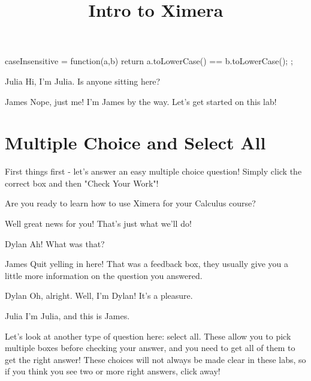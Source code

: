\documentclass{ximera}
\title{Intro to Ximera}
\begin{document}
\maketitle
\begin{javascript}
 caseInsensitive = function(a,b) {
    return a.toLowerCase() == b.toLowerCase();
  };
\end{javascript}

\begin{dialogue}
\item[Julia] Hi, I'm Julia. Is anyone sitting here?
\item[James] Nope, just me! I'm James by the way. Let's get started on this lab!
\end{dialogue}

\section{Multiple Choice and Select All}
First things first - let's answer an easy multiple choice question! Simply click the correct box and then "Check Your Work"!

\begin{question}
Are you ready to learn how to use Ximera for your Calculus course?

\begin{multipleChoice}
\end{multipleChoice}
\begin{feedback}[correct]
Well great news for you! That's just what we'll do!
\end{feedback}

\end{question}
\begin{dialogue}
\item[Dylan] Ah! What was that?
\item[James] Quit yelling in here! That was a feedback box, they usually give you a little more information on the question you answered.
\item[Dylan] Oh, alright. Well, I'm Dylan! It's a pleasure.
\item[Julia] I'm Julia, and this is James.
\end{dialogue}

Let's look at another type of question here: select all. These allow you to pick multiple boxes before checking your answer, and you need to get all of them to get the right answer! These choices will not always be made clear in these labs, so if you think you see two or more right answers, click away!
\end{document}
